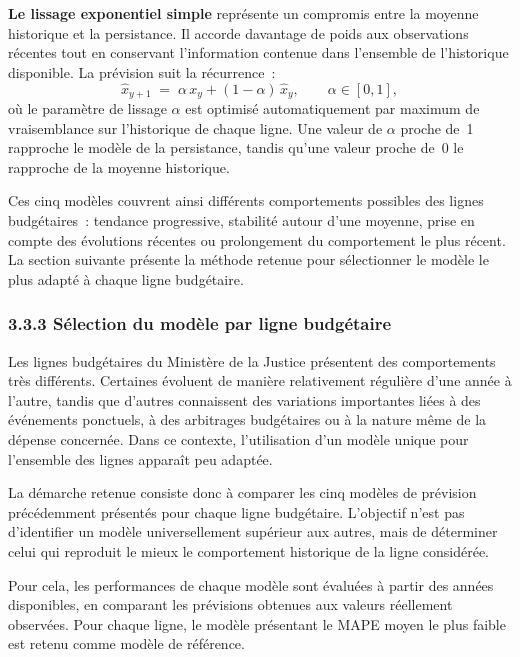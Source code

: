 \textbf{Le lissage exponentiel simple} repr\'esente un compromis entre la
moyenne historique et la persistance. Il accorde davantage de poids aux
observations r\'ecentes tout en conservant l'information contenue dans
l'ensemble de l'historique disponible. La pr\'evision suit la r\'ecurrence~:
$$
\widehat{x}_{y+1} \;=\; \alpha\, x_y + (1-\alpha)\, \widehat{x}_y,
\qquad \alpha \in [0,1],
$$
o\`u le param\`etre de lissage $\alpha$ est optimis\'e automatiquement par
maximum de vraisemblance sur l'historique de chaque ligne. Une valeur de
$\alpha$ proche de~1 rapproche le mod\`ele de la persistance, tandis qu'une
valeur proche de~0 le rapproche de la moyenne historique.

Ces cinq mod\`eles couvrent ainsi diff\'erents comportements possibles des
lignes budg\'etaires~: tendance progressive, stabilit\'e autour d'une moyenne,
prise en compte des \'evolutions r\'ecentes ou prolongement du comportement
le plus r\'ecent. La section suivante pr\'esente la m\'ethode retenue pour
s\'electionner le mod\`ele le plus adapt\'e \`a chaque ligne budg\'etaire.

\subsubsection*{3.3.3 \quad S\'election du mod\`ele par ligne budg\'etaire}

Les lignes budg\'etaires du Minist\`ere de la Justice pr\'esentent des
comportements tr\`es diff\'erents. Certaines \'evoluent de mani\`ere relativement
r\'eguli\`ere d'une ann\'ee \`a l'autre, tandis que d'autres connaissent des
variations importantes li\'ees \`a des \'ev\'enements ponctuels, \`a des
arbitrages budg\'etaires ou \`a la nature m\^eme de la d\'epense concern\'ee.
Dans ce contexte, l'utilisation d'un mod\`ele unique pour l'ensemble des
lignes appara\^it peu adapt\'ee.

La d\'emarche retenue consiste donc \`a comparer les cinq mod\`eles de
pr\'evision pr\'ec\'edemment pr\'esent\'es pour chaque ligne budg\'etaire.
L'objectif n'est pas d'identifier un mod\`ele universellement sup\'erieur aux
autres, mais de d\'eterminer celui qui reproduit le mieux le comportement
historique de la ligne consid\'er\'ee.

Pour cela, les performances de chaque mod\`ele sont \'evalu\'ees \`a partir des
ann\'ees disponibles, en comparant les pr\'evisions obtenues aux valeurs
r\'eellement observ\'ees. Pour chaque ligne, le mod\`ele pr\'esentant le MAPE
moyen le plus faible est retenu comme mod\`ele de r\'ef\'erence.

